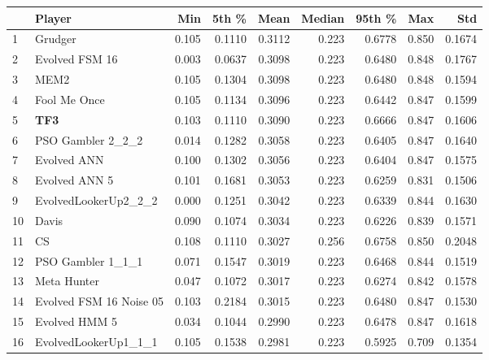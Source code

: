 \begin{tabular}{llrrrrrrr}
\toprule
{} &                   Player &    Min &   5th \% &    Mean &  Median &  95th \% &    Max &     Std \\
\midrule
1  &                  Grudger &  0.105 &  0.1110 &  0.3112 &   0.223 &  0.6778 &  0.850 &  0.1674 \\
2  &           Evolved FSM 16 &  0.003 &  0.0637 &  0.3098 &   0.223 &  0.6480 &  0.848 &  0.1767 \\
3  &                     MEM2 &  0.105 &  0.1304 &  0.3098 &   0.223 &  0.6480 &  0.848 &  0.1594 \\
4  &             Fool Me Once &  0.105 &  0.1134 &  0.3096 &   0.223 &  0.6442 &  0.847 &  0.1599 \\
5  &                      \textbf{TF3} &  0.103 &  0.1110 &  0.3090 &   0.223 &  0.6666 &  0.847 &  0.1606 \\
6  &        PSO Gambler 2\_2\_2 &  0.014 &  0.1282 &  0.3058 &   0.223 &  0.6405 &  0.847 &  0.1640 \\
7  &              Evolved ANN &  0.100 &  0.1302 &  0.3056 &   0.223 &  0.6404 &  0.847 &  0.1575 \\
8  &            Evolved ANN 5 &  0.101 &  0.1681 &  0.3053 &   0.223 &  0.6259 &  0.831 &  0.1506 \\
9  &     EvolvedLookerUp2\_2\_2 &  0.000 &  0.1251 &  0.3042 &   0.223 &  0.6339 &  0.844 &  0.1630 \\
10 &                    Davis &  0.090 &  0.1074 &  0.3034 &   0.223 &  0.6226 &  0.839 &  0.1571 \\
11 &                       CS &  0.108 &  0.1110 &  0.3027 &   0.256 &  0.6758 &  0.850 &  0.2048 \\
12 &        PSO Gambler 1\_1\_1 &  0.071 &  0.1547 &  0.3019 &   0.223 &  0.6468 &  0.844 &  0.1519 \\
13 &              Meta Hunter &  0.047 &  0.1072 &  0.3017 &   0.223 &  0.6274 &  0.842 &  0.1578 \\
14 &  Evolved FSM 16 Noise 05 &  0.103 &  0.2184 &  0.3015 &   0.223 &  0.6480 &  0.847 &  0.1530 \\
15 &            Evolved HMM 5 &  0.034 &  0.1044 &  0.2990 &   0.223 &  0.6478 &  0.847 &  0.1618 \\
16 &     EvolvedLookerUp1\_1\_1 &  0.105 &  0.1538 &  0.2981 &   0.223 &  0.5925 &  0.709 &  0.1354 \\
\bottomrule
\end{tabular}
